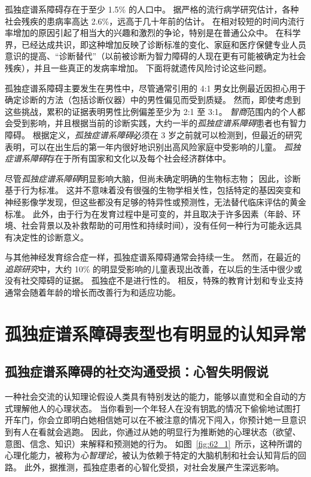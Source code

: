 孤独症谱系障碍存在于至少 1.5\% 的人口中。
据严格的流行病学研究估计，各种社会残疾的患病率高达 2.6\%，远高于几十年前的估计。
在相对较短的时间内流行率增加的原因引起了相当大的兴趣和激烈的争论，特别是在普通公众中。
在科学界，已经达成共识，即这种增加反映了诊断标准的变化、家庭和医疗保健专业人员意识的提高、“诊断替代”（以前被诊断为智力障碍的人现在更有可能被确定为社会残疾），并且一些真正的发病率增加。
下面将就遗传风险讨论这些问题。


孤独症谱系障碍主要发生在男性中，尽管通常引用的 4:1 男女比例最近因担心用于确定诊断的方法（包括诊断仪器）中的男性偏见而受到质疑。
然而，即使考虑到这些挑战，累积的证据表明男性比例偏差至少为 2:1 至 3:1。
\textit{智商}范围内的个人都会受到影响，并且根据当前的诊断实践，大约一半的\textit{孤独症谱系障碍}患者也有智力障碍。
根据定义，\textit{孤独症谱系障碍}必须在 3 岁之前就可以检测到，但最近的研究表明，可以在出生后的第一年内很好地识别出高风险家庭中受影响的儿童。
\textit{孤独症谱系障碍}存在于所有国家和文化以及每个社会经济群体中。


尽管\textit{孤独症谱系障碍}明显影响大脑，但尚未确定明确的生物标志物；
因此，诊断基于行为标准。
这并不意味着没有很强的生物学相关性，包括特定的基因突变和神经影像学发现，但这些都没有足够的特异性或预测性，无法替代临床评估的黄金标准。
此外，由于行为在发育过程中是可变的，并且取决于许多因素（年龄、环境、社会背景以及补救帮助的可用性和持续时间），没有任何一种行为可能永远具有决定性的诊断意义。


与其他神经发育综合症一样，孤独症谱系障碍通常会持续一生。
然而，在最近的\textit{追踪研究}中，大约 10\% 的明显受影响的儿童表现出改善，在以后的生活中很少或没有社交障碍的证据。
孤独症不是进行性的。
相反，特殊的教育计划和专业支持通常会随着年龄的增长而改善行为和适应功能。



\section{孤独症谱系障碍表型也有明显的认知异常}

\subsection{孤独症谱系障碍的社交沟通受损：心智失明假说}

一种社会交流的认知理论假设人类具有特别发达的能力，能够以直觉和全自动的方式理解他人的心理状态。
当你看到一个年轻人在没有钥匙的情况下偷偷地试图打开车门，你会立即明白她相信她可以在不被注意的情况下闯入，你预计她一旦意识到有人在看就会逃跑。
因此，你通过从她的明显行为推断她的心理状态（欲望、意图、信念、知识）来解释和预测她的行为。
如图~\ref{fig:62_1}~所示，这种所谓的心理化能力，被称为\textit{心智理论}，被认为依赖于特定的大脑机制和社会认知背后的回路。
此外，据推测，孤独症患者的心智化受损，对社会发展产生深远影响。


